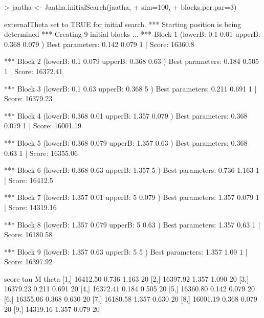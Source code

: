 
\begin{Schunk}
\begin{Sinput}
> jaatha <- Jaatha.initialSearch(jaatha, 
+                                sim=100, 
+                                blocks.per.par=3)
\end{Sinput}
\begin{Soutput}
externalTheta set to TRUE for initial search. 
*** Starting position is being determined *** 
Creating 9 initial blocks ...  
*** Block 1  (lowerB: 0.1 0.01  upperB: 0.368 0.079 ) 
Best parameters:  0.142 0.079 1 | Score: 16360.8 

*** Block 2  (lowerB: 0.1 0.079  upperB: 0.368 0.63 ) 
Best parameters:  0.184 0.505 1 | Score: 16372.41 

*** Block 3  (lowerB: 0.1 0.63  upperB: 0.368 5 ) 
Best parameters:  0.211 0.691 1 | Score: 16379.23 

*** Block 4  (lowerB: 0.368 0.01  upperB: 1.357 0.079 ) 
Best parameters:  0.368 0.079 1 | Score: 16001.19 

*** Block 5  (lowerB: 0.368 0.079  upperB: 1.357 0.63 ) 
Best parameters:  0.368 0.63 1 | Score: 16355.06 

*** Block 6  (lowerB: 0.368 0.63  upperB: 1.357 5 ) 
Best parameters:  0.736 1.163 1 | Score: 16412.5 

*** Block 7  (lowerB: 1.357 0.01  upperB: 5 0.079 ) 
Best parameters:  1.357 0.079 1 | Score: 14319.16 

*** Block 8  (lowerB: 1.357 0.079  upperB: 5 0.63 ) 
Best parameters:  1.357 0.63 1 | Score: 16180.58 

*** Block 9  (lowerB: 1.357 0.63  upperB: 5 5 ) 
Best parameters:  1.357 1.09 1 | Score: 16397.92 

         score   tau     M theta
 [1,] 16412.50 0.736 1.163    20
 [2,] 16397.92 1.357 1.090    20
 [3,] 16379.23 0.211 0.691    20
 [4,] 16372.41 0.184 0.505    20
 [5,] 16360.80 0.142 0.079    20
 [6,] 16355.06 0.368 0.630    20
 [7,] 16180.58 1.357 0.630    20
 [8,] 16001.19 0.368 0.079    20
 [9,] 14319.16 1.357 0.079    20
\end{Soutput}
\end{Schunk}

